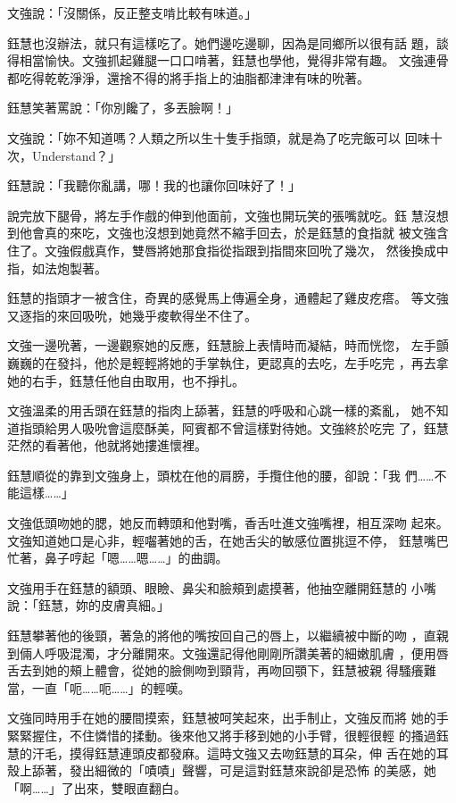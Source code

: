 文強說：「沒關係，反正整支啃比較有味道。」

鈺慧也沒辦法，就只有這樣吃了。她們邊吃邊聊，因為是同鄉所以很有話
題，談得相當愉快。文強抓起雞腿一口口啃著，鈺慧也學他，覺得非常有趣。
文強連骨都吃得乾乾淨淨，還捨不得的將手指上的油脂都津津有味的吮著。

鈺慧笑著罵說：「你別饞了，多丟臉啊！」

文強說：「妳不知道嗎？人類之所以生十隻手指頭，就是為了吃完飯可以
回味十次，Understand？」

鈺慧說：「我聽你亂講，哪！我的也讓你回味好了！」

說完放下腿骨，將左手作戲的伸到他面前，文強也開玩笑的張嘴就吃。鈺
慧沒想到他會真的來吃，文強也沒想到她竟然不縮手回去，於是鈺慧的食指就
被文強含住了。文強假戲真作，雙唇將她那食指從指跟到指間來回吮了幾次，
然後換成中指，如法炮製著。

鈺慧的指頭才一被含住，奇異的感覺馬上傳遍全身，通體起了雞皮疙瘩。
等文強又逐指的來回吸吮，她幾乎痠軟得坐不住了。

文強一邊吮著，一邊觀察她的反應，鈺慧臉上表情時而凝結，時而恍惚，
左手顫巍巍的在發抖，他於是輕輕將她的手掌執住，更認真的去吃，左手吃完
，再去拿她的右手，鈺慧任他自由取用，也不掙扎。

文強溫柔的用舌頭在鈺慧的指肉上舔著，鈺慧的呼吸和心跳一樣的紊亂，
她不知道指頭給男人吸吮會這麼酥美，阿賓都不曾這樣對待她。文強終於吃完
了，鈺慧茫然的看著他，他就將她摟進懷裡。

鈺慧順從的靠到文強身上，頭枕在他的肩膀，手攬住他的腰，卻說：「我
們……不能這樣……」

文強低頭吻她的腮，她反而轉頭和他對嘴，香舌吐進文強嘴裡，相互深吻
起來。文強知道她口是心非，輕囓著她的舌，在她舌尖的敏感位置挑逗不停，
鈺慧嘴巴忙著，鼻子哼起「嗯……嗯……」的曲調。

文強用手在鈺慧的額頭、眼瞼、鼻尖和臉頰到處摸著，他抽空離開鈺慧的
小嘴說：「鈺慧，妳的皮膚真細。」

鈺慧攀著他的後頸，著急的將他的嘴按回自己的唇上，以繼續被中斷的吻
，直親到倆人呼吸混濁，才分離開來。文強還記得他剛剛所讚美著的細嫩肌膚
，便用唇舌去到她的頰上體會，從她的臉側吻到頸背，再吻回顎下，鈺慧被親
得騷癢難當，一直「呃……呃……」的輕嘆。

文強同時用手在她的腰間摸索，鈺慧被呵笑起來，出手制止，文強反而將
她的手緊緊握住，不住憐惜的揉動。後來他又將手移到她的小手臂，很輕很輕
的搔過鈺慧的汗毛，摸得鈺慧連頭皮都發麻。這時文強又去吻鈺慧的耳朵，伸
舌在她的耳殼上舔著，發出細微的「嘖嘖」聲響，可是這對鈺慧來說卻是恐怖
的美感，她「啊……」了出來，雙眼直翻白。


